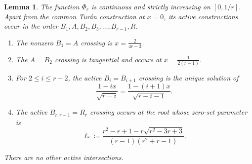 \documentclass[10pt]{article}
\numberwithin{equation}{section}
\newtheorem{lemma}[lemma]{Lemma}
\begin{document}
\begin{lemma}\label{lem:phase-diagram}
The function $\Phi_r$ is continuous and strictly increasing on $[0,1/r]$.  Apart from the common Tur\'an construction at $x=0$, its active constructions occur in the order $B_1, A, B_2, B_3,\ldots, B_{r-1}, R$. 
\begin{enumerate}[label=\textup{(\roman*)}]
\item The nonzero $B_1=A$ crossing is $x=\frac2{4r-3}$. 
\item The $A=B_2$ crossing is tangential and occurs at $x=\frac1{2(r-1)}$. 
\item For $2\le i\le r-2$, the active $B_i=B_{i+1}$ crossing is the unique solution of
\begin{equation}\label{eq:adjacent-crossing}
 \frac{1-ix}{\sqrt{r-i}}
 =\frac{1-(i+1)x}{\sqrt{r-i-1}}.
\end{equation}
\item The active $B_{r,r-1}=R_r$ crossing occurs at the root whose zero-set parameter is
\begin{equation}\label{eq:BR-crossing-ell}
 \ell_*\coloneqq\frac{r^2-r+1-r\sqrt{r^2-3r+3}}
 {(r-1)(r^2+r-1)}.
\end{equation}
\end{enumerate}
There are no other active intersections.
\end{lemma}
\end{document}
